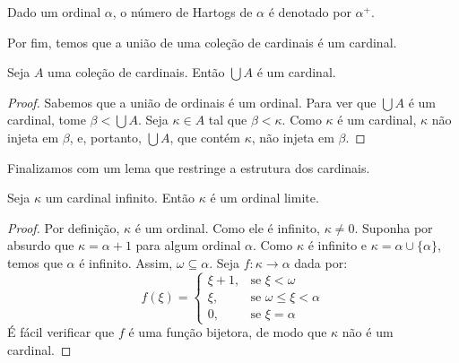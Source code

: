 \begin{definition}\label{def:sucessorCardinal}
    Dado um ordinal $\alpha$, o número de Hartogs de $\alpha$ é denotado por $\alpha^+$.
\end{definition}

Por fim, temos que a união de uma coleção de cardinais é um cardinal.

\begin{lemma}\label{lem:uniaoDeCardinaisEhCardinal}
    Seja $A$ uma coleção de cardinais.
    Então $\bigcup A$ é um cardinal.
\end{lemma}
\begin{proof}
    Sabemos que a união de ordinais é um ordinal.
    Para ver que $\bigcup A$ é um cardinal, tome $\beta<\bigcup A$.
    Seja $\kappa\in A$ tal que $\beta<\kappa$.
    Como $\kappa$ é um cardinal, $\kappa$ não injeta em $\beta$, e, portanto, $\bigcup A$, que contém $\kappa$, não injeta em $\beta$.
\end{proof}

Finalizamos com um lema que restringe a estrutura dos cardinais.

\begin{lemma}\label{lem:cardinalInfinitoEhOrdinalLimite}
Seja $\kappa$ um cardinal infinito.
Então $\kappa$ é um ordinal limite.
\end{lemma}
\begin{proof}
    Por definição, $\kappa$ é um ordinal.
    Como ele é infinito, $\kappa\neq 0$.
    Suponha por absurdo que $\kappa=\alpha+1$ para algum ordinal $\alpha$.
    Como $\kappa$ é infinito e $\kappa=\alpha\cup\{\alpha\}$, temos que $\alpha$ é infinito.
    Assim, $\omega\subseteq \alpha$.
    Seja $f:\kappa \to \alpha$ dada por:
    \[
    f(\xi) = \begin{cases}
        \xi+1, & \text{se } \xi<\omega\\
        \xi, & \text{se } \omega \leq \xi < \alpha\\
        0, & \text{se } \xi=\alpha
    \end{cases}
    \]
    É fácil verificar que $f$ é uma função bijetora, de modo que $\kappa$ não é um cardinal.
\end{proof}

